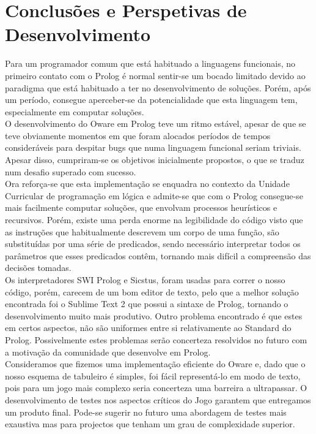 \documentclass[15pt,a4paper]{article}
\begin{document}
\section{Conclusões e Perspetivas de Desenvolvimento}
Para um programador comum que está habituado a linguagens funcionais, no primeiro contato com o Prolog é normal sentir-se um bocado limitado devido ao paradigma que está habituado a ter no desenvolvimento de soluções. Porém, após um período, consegue aperceber-se da potencialidade que esta linguagem tem, especialmente em computar soluções. \\
\indent O desenvolvimento do Oware em Prolog teve um ritmo estável, apesar de que se teve obviamente momentos em que foram alocados períodos de tempos consideráveis para despitar bugs que numa linguagem funcional seriam triviais. Apesar disso, cumpriram-se os objetivos inicialmente propostos, o que se traduz num desafio superado com sucesso.
\\ \indent Ora reforça-se que esta implementação se enquadra no contexto da Unidade Curricular de programação em lógica e admite-se que com o Prolog consegue-se mais facilmente computar soluções, que envolvam processos heurísticos e recursivos. Porém, existe uma perda enorme na legibilidade do código visto que as instruções que habitualmente descrevem um corpo de uma função, são substituídas por uma série de predicados, sendo necessário interpretar todos os parâmetros que esses predicados contêm, tornando mais difícil a compreensão das decisões tomadas. 
\\ \indent Os interpretadores SWI Prolog e Sicstus, foram usadas para correr o nosso código, porém, carecem de um bom editor de texto, pelo que a melhor solução encontrada foi o Sublime Text 2 que possui a sintaxe de Prolog, tornando o desenvolvimento muito mais produtivo. Outro problema encontrado é que estes em certos aspectos, não são uniformes entre si relativamente ao Standard do Prolog. Possivelmente estes problemas serão concerteza resolvidos no futuro com a motivação da comunidade que desenvolve em Prolog.
\\ 
\indent Consideramos que fizemos uma implementação eficiente do Oware e, dado que o nosso esquema de tabuleiro é simples, foi fácil representá-lo em modo de texto, pois para um jogo mais complexo seria concerteza uma barreira a ultrapassar. O desenvolvimento de testes nos aspectos críticos do Jogo garantem que entregamos um produto final. Pode-se sugerir no futuro uma abordagem de testes mais exaustiva mas para projectos que tenham um grau de complexidade superior. 
\newpage
\end{document}
